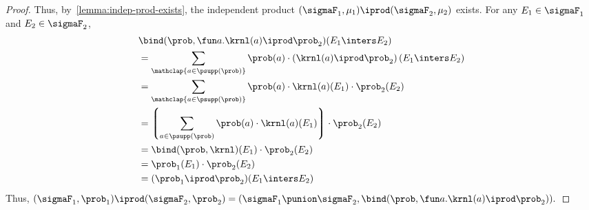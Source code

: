 \begin{proof}
   Thus, by~\cref{lemma:indep-prod-exists},
   the independent product $(\sigmaF_1, \mu_1) \iprod (\sigmaF_2, \mu_2)$ exists.
For any $E_1 \in \sigmaF_1$ and $E_2 \in \sigmaF_2$,
\begin{align*}
   &\bind(\prob, \fun a. \krnl(a) \iprod \prob_2 ) (E_1 \inters E_2)\\
  &= \sum_{\mathclap{a \in \psupp(\prob)}}
     \prob(a) \cdot
     \left(\krnl(a) \iprod  \prob_2\right)(E_1 \inters E_2) \\
  &= \sum_{\mathclap{a \in \psupp(\prob)}}
      \prob(a) \cdot \krnl(a)(E_1) \cdot \prob_2(E_2) \\
  &= \left\lgroup
     \sum_{a \in \psupp(\prob)}
      \prob(a) \cdot \krnl(a)(E_1)
    \right\rgroup \cdot \prob_2(E_2) \\
  &= \bind(\prob, \krnl)(E_1) \cdot \prob_2(E_2) \\
  &= \prob_1(E_1) \cdot \prob_2(E_2) \\
  &= (\prob_1 \iprod \prob_2)(E_1 \inters E_2)
  \end{align*}
Thus,
  $
   (\sigmaF_1, \prob_1) \iprod (\sigmaF_2, \prob_2)
  = (\sigmaF_1 \punion \sigmaF_2,
     \bind(\prob, \fun a. \krnl(a) \iprod \prob_2)).
  $
 \end{proof}
